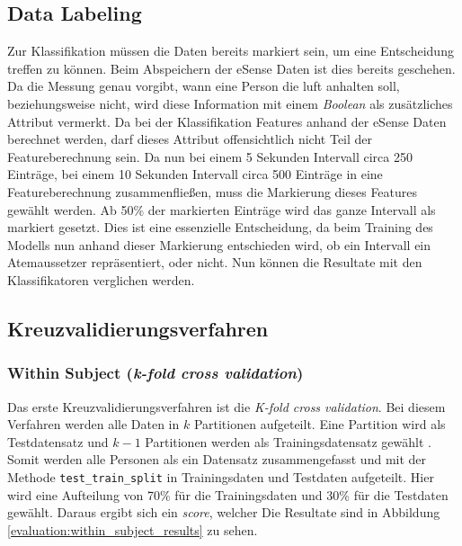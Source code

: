 \subsection{Data Labeling}
Zur Klassifikation müssen die Daten bereits markiert sein, um eine Entscheidung treffen zu können. 
Beim Abspeichern der eSense Daten ist dies bereits geschehen. 
Da die Messung genau vorgibt, wann eine Person die luft anhalten soll, beziehungsweise nicht, wird diese Information mit einem \textit{Boolean} als zusätzliches Attribut vermerkt.
Da bei der Klassifikation Features anhand der eSense Daten berechnet werden, darf dieses Attribut offensichtlich nicht Teil der Featureberechnung sein.
Da nun bei einem 5 Sekunden Intervall circa 250 Einträge, bei einem 10 Sekunden Intervall circa 500 Einträge in eine Featureberechnung zusammenfließen, muss die Markierung dieses Features gewählt werden.
Ab 50\% der markierten Einträge wird das ganze Intervall als markiert gesetzt.
Dies ist eine essenzielle Entscheidung, da beim Training des Modells nun anhand dieser Markierung entschieden wird, ob ein Intervall ein Atemaussetzer repräsentiert, oder nicht.
Nun können die Resultate mit den Klassifikatoren verglichen werden.

\subsection{Kreuzvalidierungsverfahren}
\subsubsection{Within Subject (\textit{k-fold cross validation})}
Das erste Kreuzvalidierungsverfahren ist die \textit{K-fold cross validation}.
Bei diesem Verfahren werden alle Daten in $k$ Partitionen aufgeteilt.
Eine Partition wird als Testdatensatz und $k-1$ Partitionen werden als Trainingsdatensatz gewählt \cite{neumannMaschineLearningKIT2020}.
Somit werden alle Personen als ein Datensatz zusammengefasst und mit der Methode \texttt{test\_train\_split} in Trainingsdaten und Testdaten aufgeteilt.
Hier wird eine Aufteilung von 70\% für die Trainingsdaten und 30\% für die Testdaten gewählt. 
Daraus ergibt sich ein \textit{score}, welcher 
Die Resultate sind in Abbildung \ref{evaluation:within_subject_results} zu sehen.

